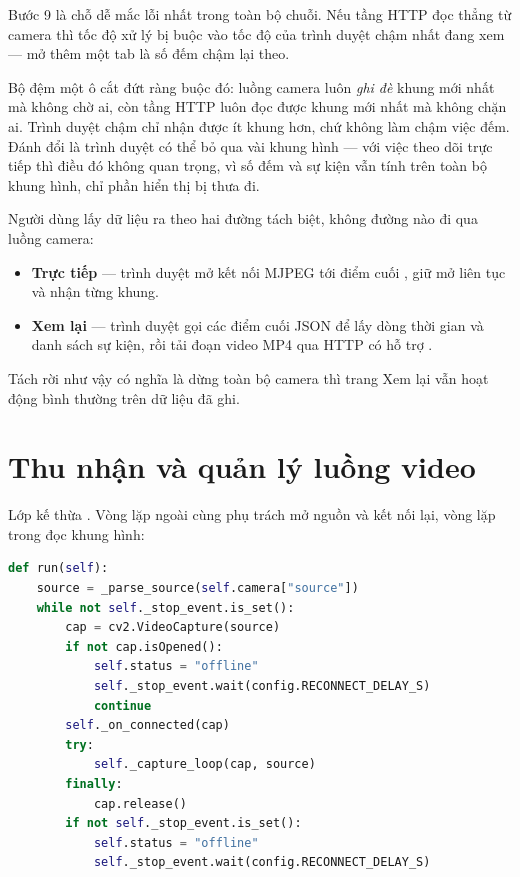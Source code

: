 Bước 9 là chỗ dễ mắc lỗi nhất trong toàn bộ chuỗi. Nếu tầng HTTP đọc thẳng từ camera
thì tốc độ xử lý bị buộc vào tốc độ của trình duyệt chậm nhất đang xem --- mở thêm một
tab là số đếm chậm lại theo.

Bộ đệm một ô cắt đứt ràng buộc đó: luồng camera luôn \emph{ghi đè} khung mới nhất mà
không chờ ai, còn tầng HTTP luôn đọc được khung mới nhất mà không chặn ai. Trình duyệt
chậm chỉ nhận được ít khung hơn, chứ không làm chậm việc đếm. Đánh đổi là trình duyệt
có thể bỏ qua vài khung hình --- với việc theo dõi trực tiếp thì điều đó không quan
trọng, vì số đếm và sự kiện vẫn tính trên toàn bộ khung hình, chỉ phần hiển thị bị
thưa đi.

Người dùng lấy dữ liệu ra theo hai đường tách biệt, không đường nào đi qua luồng
camera:

\begin{itemize}[leftmargin=*, itemsep=2pt]
  \item \textbf{Trực tiếp} --- trình duyệt mở kết nối MJPEG tới điểm cuối
        , giữ mở liên tục và nhận từng khung.
  \item \textbf{Xem lại} --- trình duyệt gọi các điểm cuối JSON để lấy dòng thời gian
        và danh sách sự kiện, rồi tải đoạn video MP4 qua HTTP có hỗ trợ .
\end{itemize}

Tách rời như vậy có nghĩa là dừng toàn bộ camera thì trang Xem lại vẫn hoạt động bình
thường trên dữ liệu đã ghi.

\section{Thu nhận và quản lý luồng video}
\label{sec:thunhan}

Lớp  kế thừa . Vòng lặp ngoài cùng phụ
trách mở nguồn và kết nối lại, vòng lặp trong đọc khung hình:

\begin{lstlisting}[language=Python, caption={Vòng lặp chính của luồng camera, rút gọn từ \code{app/worker.py}}]
def run(self):
    source = _parse_source(self.camera["source"])
    while not self._stop_event.is_set():
        cap = cv2.VideoCapture(source)
        if not cap.isOpened():
            self.status = "offline"
            self._stop_event.wait(config.RECONNECT_DELAY_S)
            continue
        self._on_connected(cap)
        try:
            self._capture_loop(cap, source)
        finally:
            cap.release()
        if not self._stop_event.is_set():
            self.status = "offline"
            self._stop_event.wait(config.RECONNECT_DELAY_S)
\end{lstlisting}

